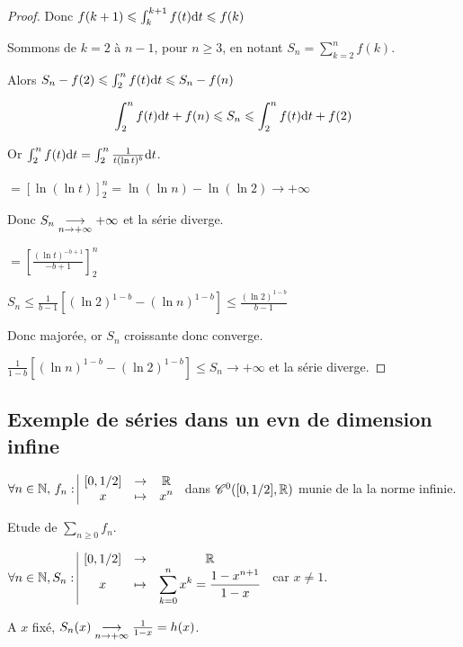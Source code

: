 \begin{proof}
    Donc $f(k + 1) \leqslant \int_{k}^{k + 1} f(t) \text d t \leqslant f(k)$

    Sommons de $k = 2$ à $n - 1$, pour $n \geqslant 3$, en notant $\displaystyle S_n = \sum_{k = 2}^{n} f(k)$. 

    Alors $S_n - f(2) \leqslant \int_{2}^{n} f(t) \text d t \leqslant S_n - f(n)$

    $$ \int_{2}^{n} f(t) \text d t + f(n) \leqslant S_n \leqslant \int_{2}^{n} f(t) \text d t + f(2)$$

    Or $\int_{2}^{n} f(t) \text d t = \int_{2}^{n} \frac 1 {t (\ln t)^b} \text d t$.

    \qquad {}

    $ = \left[ \ln(\ln t) \right]_{2}^{n} = \ln(\ln n) - \ln(\ln 2) \longrightarrow + \infty$

    Donc $S_n \underset{n \to + \infty}{\longrightarrow} + \infty$ et la série diverge.

    \qquad {}

    $ = \left[ \frac{(\ln t)^{-b + 1}}{-b + 1} \right]_{2}^{n}$ 

    \qquad {}

    $S_n \leqslant \frac 1 {b - 1} \left[ (\ln 2)^{1 - b} - (\ln n)^{1 - b} \right] \leqslant \frac{(\ln 2)^{1 - b}}{b - 1}$

    Donc majorée, or $S_n$ croissante donc converge.

    \qquad {}

    $\frac 1 {1 - b} \left[ (\ln n)^{1 - b} - (\ln 2)^{1 - b} \right] \leqslant S_n \longrightarrow + \infty$
    et la série diverge. 

\end{proof}


\subsection{Exemple de séries dans un evn de dimension infine }


$\forall n \in \mathbb{N}, \, f_n: \space \begin{array}{|ccc} \displaystyle [0, 1 / 2] & \to & \displaystyle \mathbb{R} \\ \displaystyle x & \mapsto & \displaystyle x^n \end{array}$ dans $\mathscr C^0([0, 1 / 2], \mathbb{R})$ 
munie de la la norme infinie. 


Etude de $\sum_{n \geqslant 0} f_n$.

\avspace $\forall n \in \mathbb{N}, S_n: \space \begin{array}{|ccc} \displaystyle [0, 1 / 2] & \to & \displaystyle \mathbb{R} \\ \displaystyle x & \mapsto & \displaystyle \sum_{k = 0}^n x^k = \frac{1 - x^{n + 1}}{1 - x} \end{array}$ car $x \neq 1$. 

\avspace A $x$ fixé, $S_n(x) \underset{n \to + \infty}{\longrightarrow} \frac 1 {1 - x} = h(x)$.

